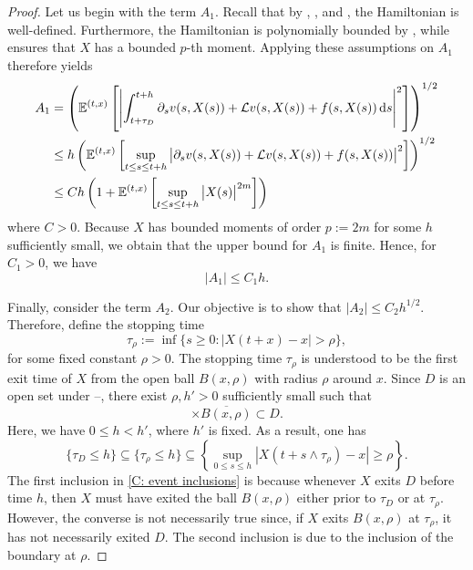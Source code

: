 \begin{proof}
    Let us begin with the term $A_1$. Recall that by , , and , the Hamiltonian is well-defined. Furthermore, the Hamiltonian is polynomially bounded by , while  ensures that $X$ has a bounded $p$-th moment. Applying these assumptions on $A_1$ therefore yields
    \begin{align*}
        A_1 &= \left(\mathbb{E}^{(t,x)} \left[ \left| \int_{t+\tau_D}^{t+h} \partial_s v(s, X(s)) + \mathcal{L} v(s,X(s)) + f(s,X(s)) \,\mathrm{d} s \right|^2 \right]\right)^{1/2} \\
        & \leq h \left(\mathbb{E}^{(t,x)} \left[  \sup_{t \leq s \leq t+h}\big|\partial_s v(s, X(s)) + \mathcal{L} v(s,X(s)) + f(s,X(s))\big|^2 \right]\right)^{1/2} \\
        & \leq C h \left(1+ \mathbb{E}^{(t,x)} \left[\sup_{t \leq s \leq t+h} \big|X(s)\big|^{2m} \right] \right) 
    \end{align*}
    where $C>0$. Because $X$ has bounded moments of order $p:=2m$ for some $h$ sufficiently small, we obtain that the upper bound for $A_1$ is finite. Hence, for $C_1>0$, we have
    \begin{equation}
        |A_1| \leq C_1 h.
        \label{C: A1 upper bound}
    \end{equation}

    Finally, consider the term $A_2$. Our objective is to show that $|A_2| \leq C_2 h^{1/2}$. Therefore, define the stopping time
    \begin{equation*}
        \tau_\rho := \inf\{s\geq 0: |X(t+x)-x|> \rho\},
    \end{equation*}
    for some fixed constant $\rho>0$. The stopping time $\tau_\rho$ is understood to be the first exit time of $X$ from the open ball $B(x,\rho)$ with radius $\rho$ around $x$. Since $D$ is an open set under --, there exist $\rho, h'>0$ sufficiently small such that 
    \begin{equation*}
        [t,t+h'] \times \overline{B(x,\rho)} \subset D.
    \end{equation*}
    Here, we have $0\leq h < h'$, where $h'$ is fixed. As a result, one has
    \begin{equation}
        \{\tau_D \leq h\} \subseteq \{\tau_\rho \leq h\} \subseteq \left\{\sup_{0 \leq s \leq h} |X(t+ s \wedge \tau_\rho ) - x| \geq \rho \right\}.
        \label{C: event inclusions}
    \end{equation}
    The first inclusion in \eqref{C: event inclusions} is because whenever $X$ exits $D$ before time $h$, then $X$ must have exited the ball $B(x,\rho)$ either prior to $\tau_D$ or at $\tau_\rho$. However, the converse is not necessarily true since, if $X$ exits $B(x,\rho)$ at $\tau_\rho$, it has not necessarily exited $D$. The second inclusion is due to the inclusion of the boundary at $\rho$. 


\end{proof}
